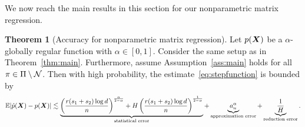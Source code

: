 \documentclass[11pt]{article}
\newcommand*{\KeepStyleUnderBrace}[1]{%
\mathop{%
\mathchoice
{\underbrace{\displaystyle#1}}%
{\underbrace{\textstyle#1}}%
{\underbrace{\scriptstyle#1}}%
{\underbrace{\scriptscriptstyle#1}}%
}\limits
}
\theoremstyle{definition}
\newtheorem{thm}{Theorem}[section]
\def\bayesS{S_{\textup{bayes}}}
\def\bayespif{f_{\textup{bayes},\pi}}
\begin{document}
%
%


We now reach the main results in this section for our nonparametric matrix regression. 

\begin{thm}[Accuracy for nonparametric matrix regression]\label{thm:regression} Let $p(\bm X)$ be a $\alpha$-globally regular function with $\alpha\in[0,1]$. Consider the same setup as in Theorem~\ref{thm:main}. Furthermore, assume Assumption~\ref{ass:main} holds for all $\pi\in\Pi\setminus \mathcal{N}$. Then with high probability, the estimate~\eqref{eq:stepfunction} is bounded by
\[
\mathbb{E}|\hat p(\mX)- p(\mX)| \lesssim  \KeepStyleUnderBrace{
\left({r(s_1+s_2)\log d\over n}\right)^{\alpha\over 2-\alpha}+H\left({r(s_1+s_2)\log d\over n}\right)^{1\over 2-\alpha}}_{\text{statistical error}} + \KeepStyleUnderBrace{a^\alpha_n}_{\text{approximation error}}+\KeepStyleUnderBrace{{1\over H}}_{\text{reduction error}}.
\]
\end{thm}
\end{document}
